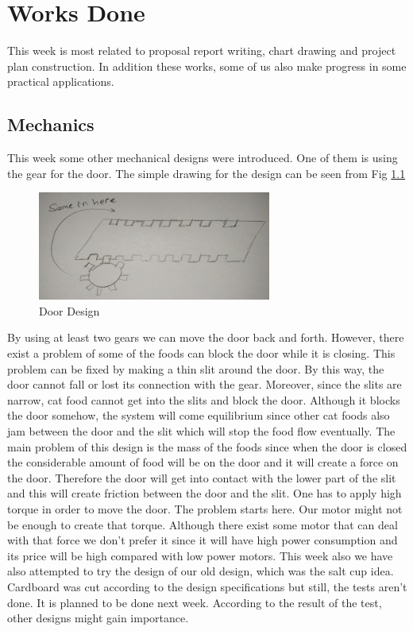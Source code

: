 \section{Works Done}
\label{sec:worksDone}
This week is most related to proposal report writing, chart drawing and project plan construction. In addition these works, some of us also make progress in some practical applications.
\subsection{Mechanics}
This week some other mechanical designs were introduced. One of them is using the gear for the door. The simple drawing for the design can be seen from Fig \ref{}

\begin{figure}
    \centering
    \includegraphics{img/mechDoga1.png}
    \caption{Door Design}
    \label{fig:mechDoga1}
\end{figure}

By using at least two gears we can move the door back and forth. However, there exist a problem of some of the foods can block the door while it is closing. This problem can be fixed by making a thin slit around the door. By this way, the door cannot fall or lost its connection with the gear. Moreover, since the slits are narrow, cat food cannot get into the slits and block the door. Although it blocks the door somehow, the system will come equilibrium since other cat foods also jam between the door and the slit which will stop the food flow eventually. 
The main problem of this design is the mass of the foods since when the door is closed the considerable amount of food will be on the door and it will create a force on the door. Therefore the door will get into contact with the lower part of the slit and this will create friction between the door and the slit. One has to apply high torque in order to move the door. The problem starts here. Our motor might not be enough to create that torque. Although there exist some motor that can deal with that force we don’t prefer it since it will have high power consumption and its price will be high compared with low power motors.
This week also we have also attempted to try the design of our old design, which was the salt cup idea. Cardboard was cut according to the design specifications but still, the tests aren't done. It is planned to be done next week. According to the result of the test, other designs might gain importance.



